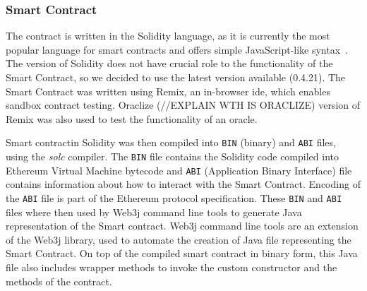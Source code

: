% 
% 
\subsubsection{Smart Contract}
The contract is written in the Solidity language, as it is currently the most popular language for smart contracts and offers simple JavaScript-like syntax~\cite{Tikhomirov2018Ethereum:Perspectives}. The version of Solidity does not have crucial role to the functionality of the Smart Contract, so we decided to use the latest version available (0.4.21)\footnotemark. The Smart Contract was written using Remix, an in-browser \acrshort{ide}, which enables sandbox contract testing. Oraclize (//EXPLAIN WTH IS ORACLIZE) version of Remix was also used to test the functionality of an oracle.
% 

Smart contract\footnotemark in Solidity was then compiled into \texttt{BIN} (binary) and \texttt{ABI} files, using the \textit{solc} compiler.
% 
% 
The \texttt{BIN} file contains the Solidity code compiled into Ethereum Virtual Machine bytecode and \texttt{ABI} (Application Binary Interface) file contains information about how to interact with the Smart Contract. Encoding of the \texttt{ABI} file is part of the Ethereum protocol specification\footnotemark. These \texttt{BIN} and \texttt{ABI} files where then used by Web3j command line tools to generate Java representation of the Smart contract\footnotemark.
% 
% 
Web3j command line tools are an extension of the Web3j library, used to automate the creation of Java file representing the Smart Contract. On top of the compiled smart contract in binary form, this Java file also includes wrapper methods to invoke the custom constructor and the methods of the contract.
% 
% 
% 
% 
